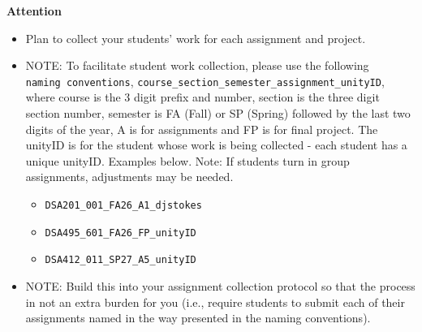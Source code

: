 \documentclass[
  letterpaper,
  DIV=11,
  numbers=noendperiod]{scrreprt}
\providecommand{\tightlist}{%
  \setlength{\itemsep}{0pt}\setlength{\parskip}{0pt}}
\begin{document}
\begin{tcolorbox}[enhanced jigsaw, toprule=.15mm, colback=white, arc=.35mm, colframe=quarto-callout-note-color-frame, bottomrule=.15mm, rightrule=.15mm, breakable, leftrule=.75mm, left=2mm, opacityback=0]
\begin{minipage}[t]{5.5mm}
\textcolor{quarto-callout-note-color}{\faInfo}
\end{minipage}%
\begin{minipage}[t]{\textwidth - 5.5mm}

\vspace{-3mm}\textbf{{Attention}}\vspace{3mm}

\begin{itemize}
\tightlist
\item
  {Plan to collect your students' work for each assignment and project.}
\end{itemize}

\end{minipage}%
\end{tcolorbox}

\begin{itemize}
\item
  NOTE: To facilitate student work collection, please use the following
  \texttt{naming\ conventions},
  \texttt{course\_section\_semester\_assignment\_unityID}, where course
  is the 3 digit prefix and number, section is the three digit section
  number, semester is FA (Fall) or SP (Spring) followed by the last two
  digits of the year, A is for assignments and FP is for final project.
  The unityID is for the student whose work is being collected - each
  student has a unique unityID. Examples below. Note: If students turn
  in group assignments, adjustments may be needed.

  \begin{itemize}
  \item
    \texttt{DSA201\_001\_FA26\_A1\_djstokes}
  \item
    \texttt{DSA495\_601\_FA26\_FP\_unityID}
  \item
    \texttt{DSA412\_011\_SP27\_A5\_unityID}
  \end{itemize}
\item
  NOTE: Build this into your assignment collection protocol so that the
  process in not an extra burden for you (i.e., require students to
  submit each of their assignments named in the way presented in the
  naming conventions).
\end{itemize}
\end{document}
